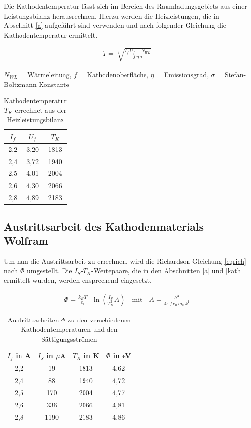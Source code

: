 Die Kathodentemperatur lässt sich im Bereich des Raumladungsgebiets aus einer Leistungsbilanz herausrechnen. Hierzu werden die Heizleistungen,
die in Abschnitt \ref{a} aufgeführt sind verwenden und nach folgender Gleichung die Kathodentemperatur ermittelt.

\begin{formel}
 \begin{align}
  T = \sqrt[4]{\frac{I_f\,U_f - N_{WL}}{f \, \eta \, \sigma}}
 \end{align}
\caption*{\small{$N_{WL}$ = Wärmeleitung, $f$ = Kathodenoberfläche, $\eta$ = Emissionsgrad, $\sigma$ = Stefan-Boltzmann Konstante}}
\end{formel}


\begin{table}[H]
 \begin{tabular}{c|c|c}
  $I_f$ & $U_f$ & $T_K$ \\
  \hline
2,2&	3,20&	1813 \\
2,4&	3,72&	1940\\
2,5&	4,01&	2004\\
2,6&	4,30&	2066\\
2,8&	4,89&	2183\\
 \end{tabular}
\caption{Kathodentemperatur $T_K$ errechnet aus der Heizleistungsbilanz}
\end{table}

\subsection{Austrittsarbeit des Kathodenmaterials Wolfram}
\label{wolf}
Um nun die Austrittsarbeit zu errechnen, wird die Richardson-Gleichung \eqref{eqrich} nach  $\Phi$ umgestellt. Die $I_S$-$T_K$-Wertepaare,
die in den Abschnitten \ref{a} und \ref{kath} ermittelt wurden, werden ensprechend eingesetzt.

\begin{align}
 \Phi = \frac{k_B \, T}{e_0} \cdot \ln\left(\frac{I_S}{T_K^2}A \right) \quad \text{mit} \quad A = \frac{h^3}{4 \pi \, f \, e_0 \, m_0 \, k^2}
\end{align}

\begin{table}[H]
 \begin{tabular}{c|c|c|c}
$I_f$ in A & $I_S$ in $\mu$A & $T_K$ in K &$\Phi$ in eV \\
\hline
2,2&	19		&	1813&	4,62\\
2,4&	88		&	1940&	4,72\\
2,5&	170		&	2004&	4,77\\
2,6&	336		&	2066&	4,81\\
2,8&	1190	&	2183&	4,86 \\

 \end{tabular}
\caption{Austrittsarbeiten $\Phi$ zu den verschiedenen Kathodentemperaturen und den Sättigungsströmen}
\label{tabrich}
\end{table}

